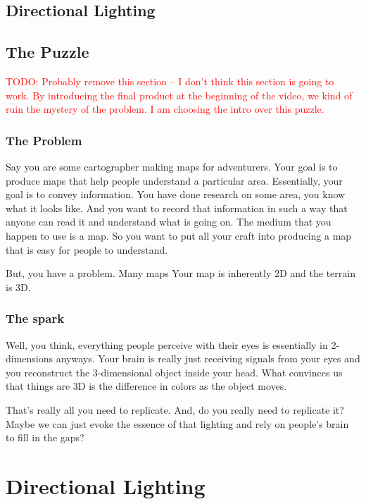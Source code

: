 \documentclass{article}
\newcommand\todo[1]{\textcolor{red}{TODO: #1}}
\begin{document}
\subsection{Directional Lighting}



\subsection{The Puzzle}

\todo{Probably remove this section -- I don't think this section is going to work. By introducing the final product at the beginning of the video, we kind of ruin the mystery of the problem. I am choosing the intro over this puzzle.}

\subsubsection{The Problem}

Say you are some cartographer making maps for adventurers.
Your goal is to produce maps that help people understand a particular area.
Essentially, your goal is to convey information.
You have done research on some area, you know what it looks like.
And you want to record that information in such a way that anyone can read it and understand what is going on.
The medium that you happen to use is a map.
So you want to put all your craft into producing a map that is easy for people to understand.

But, you have a problem.
Many maps
Your map is inherently 2D and the terrain is 3D.

\subsubsection{The spark}

Well, you think, everything people perceive with their eyes is essentially in 2-dimensions anyways.
Your brain is really just receiving signals from your eyes and you reconstruct the 3-dimensional object inside your head.
What convinces us that things are 3D is the difference in colors as the object moves.

That's really all you need to replicate.
And, do you really need to replicate it?
Maybe we can just evoke the essence of that lighting and rely on people's brain to fill in the gaps?

\section{Directional Lighting}
\end{document}
